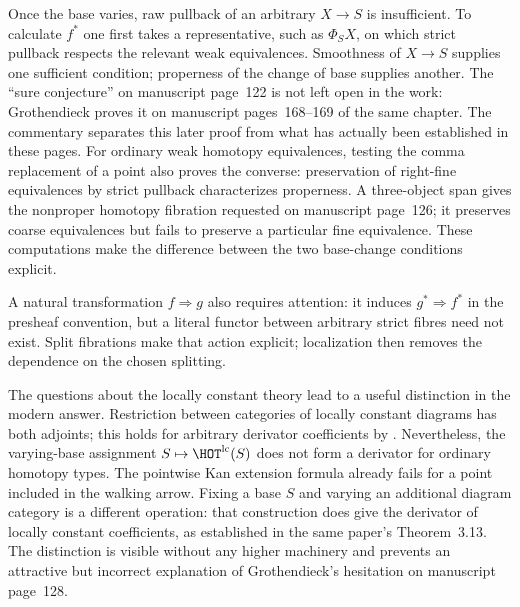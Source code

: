 Once the base varies, raw pullback of an arbitrary $X\to S$ is insufficient. To calculate $f^*$ one first takes a representative, such as $\Phi_SX$, on which strict pullback respects the relevant weak equivalences. Smoothness of $X\to S$ supplies one sufficient condition; properness of the change of base supplies another. The ``sure conjecture'' on manuscript page~122 is not left open in the work: Grothendieck proves it on manuscript pages~168--169 of the same chapter. The commentary separates this later proof from what has actually been established in these pages. For ordinary weak homotopy equivalences, testing the comma replacement of a point also proves the converse: preservation of right-fine equivalences by strict pullback characterizes properness. A three-object span gives the nonproper homotopy fibration requested on manuscript page~126; it preserves coarse equivalences but fails to preserve a particular fine equivalence. These computations make the difference between the two base-change conditions explicit.

A natural transformation $f\Rightarrow g$ also requires attention: it induces $g^*\Rightarrow f^*$ in the presheaf convention, but a literal functor between arbitrary strict fibres need not exist. Split fibrations make that action explicit; localization then removes the dependence on the chosen splitting.

The questions about the locally constant theory lead to a useful distinction in the modern answer. Restriction between categories of locally constant diagrams has both adjoints; this holds for arbitrary derivator coefficients by \citet[Corollary~3.11]{Cisinski2009LocallyConstant}. Nevertheless, the varying-base assignment $S\mapsto\HOT^{\mathrm{lc}}(S)$ does not form a derivator for ordinary homotopy types. The pointwise Kan extension formula already fails for a point included in the walking arrow. Fixing a base $S$ and varying an additional diagram category is a different operation: that construction does give the derivator of locally constant coefficients, as established in the same paper's Theorem~3.13. The distinction is visible without any higher machinery and prevents an attractive but incorrect explanation of Grothendieck's hesitation on manuscript page~128.

